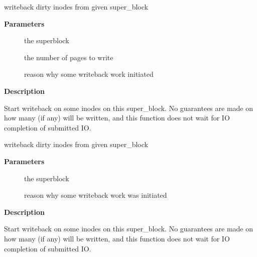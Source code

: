 \documentclass[a4paper,8pt,english]{sphinxmanual}
\begin{document}
\begin{fulllineitems}
\label{filesystems/index:c.writeback_inodes_sb_nr}
writeback dirty inodes from given super\_block

\end{fulllineitems}


\textbf{Parameters}
\begin{description}
\item[{}] \leavevmode
the superblock

\item[{}] \leavevmode
the number of pages to write

\item[{}] \leavevmode
reason why some writeback work initiated

\end{description}

\textbf{Description}

Start writeback on some inodes on this super\_block. No guarantees are made
on how many (if any) will be written, and this function does not wait
for IO completion of submitted IO.

\begin{fulllineitems}
\label{filesystems/index:c.writeback_inodes_sb}
writeback dirty inodes from given super\_block

\end{fulllineitems}


\textbf{Parameters}
\begin{description}
\item[{}] \leavevmode
the superblock

\item[{}] \leavevmode
reason why some writeback work was initiated

\end{description}

\textbf{Description}

Start writeback on some inodes on this super\_block. No guarantees are made
on how many (if any) will be written, and this function does not wait
for IO completion of submitted IO.
\end{document}
